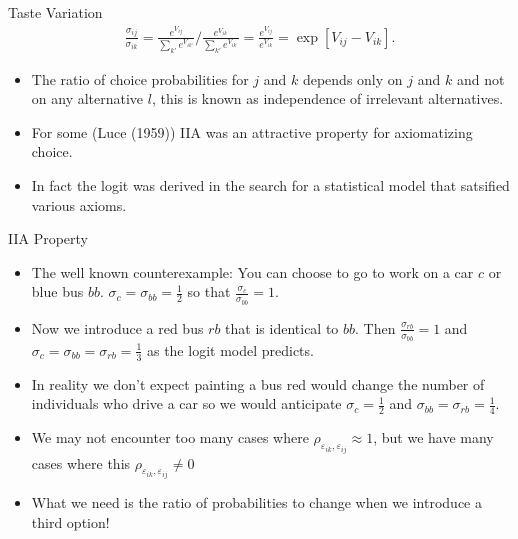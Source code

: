 \documentclass[aspectratio=169,11pt]{beamer}
\begin{document}
\begin{frame}{Taste Variation}
\begin{eqnarray*}
\frac{\sigma_{ij}}{\sigma_{ik}} = \frac{e^{V_{ij}}}{\sum_{k'} e^{V_{ik'}}} / \frac{e^{V_{ik}}}{\sum_{k'} e^{V_{ik'}}} = \frac{e^{V_{ij}}}{e^{V_{ik}}} = \exp[V_{ij} - V_{ik}].
\end{eqnarray*}
\begin{itemize}
\item The ratio of choice probabilities for $j$ and $k$ depends only on $j$ and $k$ and not on any alternative $l$, this is known as \alert{independence of irrelevant alternatives}.
\item For some (Luce (1959)) IIA was an attractive property for axiomatizing choice.
\item In fact the logit was derived in the search for a statistical model that satsified various axioms.
\end{itemize}
\end{frame}

\begin{frame}{IIA Property}
\begin{itemize}
\item The well known counterexample: You can choose to go to work on a car $c$ or blue bus $bb$. $\sigma_{c} = \sigma_{bb} = \frac{1}{2}$ so that $\frac{\sigma_c}{\sigma_{bb}} = 1$.
\item Now we introduce a red bus $rb$ that is identical to $bb$. Then $\frac{\sigma_{rb}}{\sigma_{bb}} = 1$ and $\sigma_{c} = \sigma_{bb}= \sigma_{rb} = \frac{1}{3}$ as the logit model predicts.
\item In reality we don't expect painting a bus red would change the number of individuals who drive a car so we would anticipate $\sigma_{c} = \frac{1}{2}$ and $\sigma_{bb} = \sigma_{rb} = \frac{1}{4}$.
\item We may not encounter too many cases where $\rho_{\varepsilon_{ik},\varepsilon_{ij}} \approx 1$, but we have many cases where this $\rho_{\varepsilon_{ik},\varepsilon_{ij}} \neq 0$
\item What we need is the ratio of probabilities to change when we introduce a third option!
\end{itemize}
\end{frame}
\end{document}
